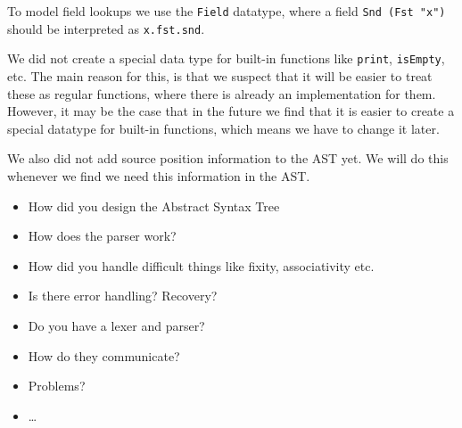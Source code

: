 To model field lookups we use the \texttt{Field} datatype,
where a field \texttt{Snd (Fst "x")} should be interpreted as \lstinline[language=SPL]|x.fst.snd|.

We did not create a special data type for built-in functions like \lstinline[language=SPL]|print|, \lstinline[language=SPL]|isEmpty|, etc.
The main reason for this, is that we suspect that it will be easier to treat these as regular functions,
where there is already an implementation for them.
However, it may be the case that in the future we find that it is easier to create a special datatype for built-in functions,
which means we have to change it later.

We also did not add source position information to the AST yet.
We will do this whenever we find we need this information in the AST.

\begin{itemize}
	\item How did you design the Abstract Syntax Tree
	\item How does the parser work?
	\item How did you handle difficult things like fixity, associativity etc.
	\item Is there error handling? Recovery?
	\item Do you have a lexer and parser?
	\item How do they communicate?
	\item Problems?
	\item\ldots
\end{itemize}

